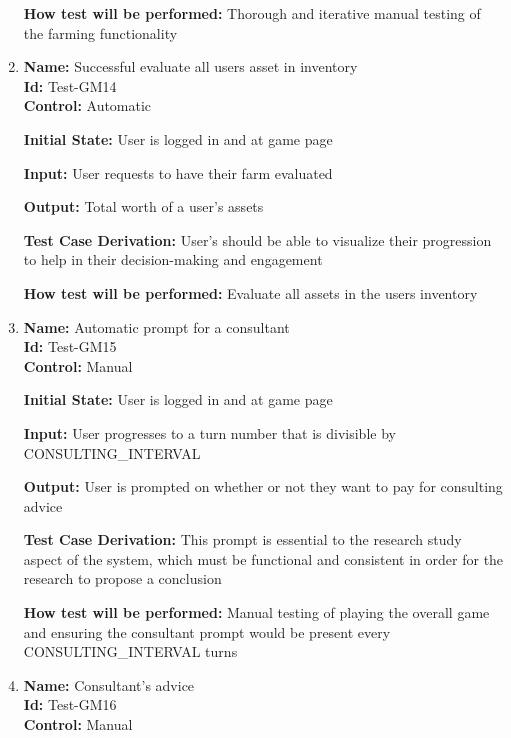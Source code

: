 \documentclass[12pt, titlepage]{article}
\begin{document}
\begin{enumerate}
\textbf{How test will be performed: }Thorough and iterative manual testing of the farming functionality

\item{\textbf{Name:} Successful evaluate all users asset in inventory\\} %
\textbf{Id: }Test-GM14 \label{Test-GM14}\\

\textbf{Control:} Automatic
					
\textbf{Initial State:} User is logged in and at game page
					
\textbf{Input:} User requests to have their farm evaluated
					
\textbf{Output:} Total worth of a user's assets %

\textbf{Test Case Derivation:} User's should be able to visualize their progression to help in their decision-making and engagement

\textbf{How test will be performed:} Evaluate all assets in the users inventory


\item{\textbf{Name:} Automatic prompt for a consultant\\} %
\textbf{Id:} Test-GM15 \label{Test-GM15} \\

\textbf{Control:} Manual
					
\textbf{Initial State:} User is logged in and at game page
					
\textbf{Input:} User progresses to a turn number that is divisible by CONSULTING\_INTERVAL
					
\textbf{Output:} User is prompted on whether or not they want to pay for consulting advice

\textbf{Test Case Derivation:} This prompt is essential to the research study aspect of the system, which must be functional and consistent in order for the research to propose a conclusion

\textbf{How test will be performed:} Manual testing of playing the overall game and ensuring the consultant prompt would be present every CONSULTING\_INTERVAL turns

\item{\textbf{Name:} Consultant's advice\\} %
\textbf{Id:} Test-GM16 \label{Test-GM16}\\

\textbf{Control:} Manual
					

\end{enumerate}
\end{document}
